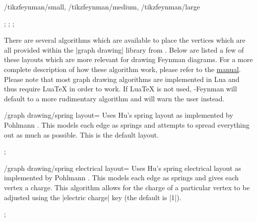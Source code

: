 \documentclass[a4paper,final]{ltxdoc}
\providecommand{\LuaTeX}{Lua\TeX}
\providecommand{\tikzfeynmanname}{\tikzname-Feynman}
\providecommand{\pgfmanual}{\href{http://mirrors.ctan.org/graphics/pgf/base/doc/pgfmanual.pdf}{\tikzname{} manual}}
\begin{document}
\begin{codeexample}[execute code=false]
\begin{keylist}{%
    /tikzfeynman/small,
    /tikzfeynman/medium,
    /tikzfeynman/large}
\begin{codeexample}[]
;
;
;
\end{codeexample}
\end{keylist}

There are several algorithms which are available to place the vertices which are
all provided within the |graph drawing| library from \tikzname.  Below are
listed a few of these layouts which are more relevant for drawing Feynman
diagrams.  For a more complete description of how these algorithm work, please
refer to the \pgfmanual{}.  Please note that most graph drawing algorithms are
implemented in Lua and thus require \LuaTeX{} in order to work.  If \LuaTeX{} is
not used, \tikzfeynmanname{} will default to a more rudimentary algorithm and
will warn the user instead.

\begin{key}{/graph drawing/spring layout=}
  Uses Hu's spring layout \cite{hu2005} as implemented by Pohlmann
  \cite{pohlmann2011}.  This models each edge as springs and attempts to spread
  everything out as much as possible.  This is the default layout.

\begin{codeexample}[]
;
\end{codeexample}
\end{key}

\begin{key}{/graph drawing/spring electrical layout=}
  Uses Hu's spring electrical layout \cite{hu2005} as implemented by Pohlmann
  \cite{pohlmann2011}.  This models each edge as springs and gives each vertex a
  charge.  This algorithm allows for the charge of a particular vertex to be
  adjusted using the |electric charge| key (the default is |1|).

\begin{codeexample}[]
;
\end{codeexample}
\end{key}


\end{codeexample}
\end{document}
